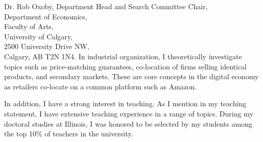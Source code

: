 \documentclass[12pt]{letter}
\begin{document}
\begin{letter}{Dr. Rob Oxoby, Department Head and Search Committee Chair, \\
Department of Economics,\\
Faculty of Arts,\\
University of Calgary,\\
2500 University Drive NW,\\
Calgary, AB T2N 1N4.}
In industrial organization, I theoretically investigate topics such as price-matching guarantees, co-location of firms selling identical products, and secondary markets.
These are core concepts in the digital economy as retailers co-locate on a common platform such as Amazon.







In addition, I have a strong interest in teaching.
As I mention in my teaching statement, I have extensive teaching experience in a range of topics.
During my doctoral studies at Illinois, I was honored to be selected by my students among the top 10\% of teachers in the university.


\end{letter}
\end{document}
